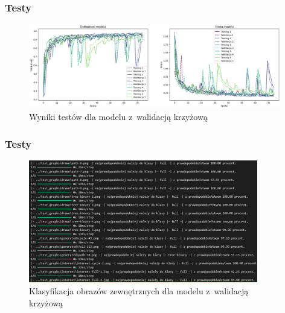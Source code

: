 \begin{frame}
    \frametitle{Testy}

    \begin{figure}[ht]
        \centering
        \includegraphics[width=11cm]{../thesis/resources/tests/images/v3/crossvalid_img.png}
        \caption{Wyniki testów dla modelu z~walidacją krzyżową}
    \end{figure}
    
\end{frame}

\begin{frame}
    \frametitle{Testy}

    \begin{figure}[ht]
        \centering
        \includegraphics[width=10cm]{../thesis/resources/tests/images/v3/crossvalid_txt.png}
        \caption{Klasyfikacja obrazów zewnętrznych dla modelu z~walidacją krzyżową}
    \end{figure}

\end{frame}

